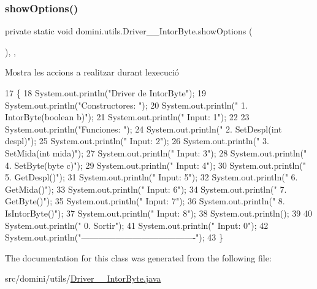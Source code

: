 \subsubsection{\texorpdfstring{show\+Options()}{showOptions()}}
{\footnotesize\ttfamily private static void domini.\+utils.\+Driver\+\_\+\+\_\+\+Intor\+Byte.\+show\+Options (\begin{DoxyParamCaption}{ }\end{DoxyParamCaption})\hspace{0.3cm}{\ttfamily [inline]}, {\ttfamily [static]}, {\ttfamily [private]}}



Mostra les accions a realitzar durant l\textquotesingle{}execució 


\begin{DoxyCode}
17                                      \{
18         System.out.println(\textcolor{stringliteral}{"Driver de IntorByte"});
19         System.out.println(\textcolor{stringliteral}{"Constructores: "});
20         System.out.println(\textcolor{stringliteral}{"     1. IntorByte(boolean b)"});
21         System.out.println(\textcolor{stringliteral}{"     Input: 1"});
22 
23         System.out.println(\textcolor{stringliteral}{"Funciones: "});
24         System.out.println(\textcolor{stringliteral}{"     2. SetDespl(int despl)"});
25         System.out.println(\textcolor{stringliteral}{"     Input: 2"});
26         System.out.println(\textcolor{stringliteral}{"     3. SetMida(int mida)"});
27         System.out.println(\textcolor{stringliteral}{"     Input: 3"});
28         System.out.println(\textcolor{stringliteral}{"     4. SetByte(byte c)"});
29         System.out.println(\textcolor{stringliteral}{"     Input: 4"});
30         System.out.println(\textcolor{stringliteral}{"     5. GetDespl()"});
31         System.out.println(\textcolor{stringliteral}{"     Input: 5"});
32         System.out.println(\textcolor{stringliteral}{"     6. GetMida()"});
33         System.out.println(\textcolor{stringliteral}{"     Input: 6"});
34         System.out.println(\textcolor{stringliteral}{"     7. GetByte()"});
35         System.out.println(\textcolor{stringliteral}{"     Input: 7"});
36         System.out.println(\textcolor{stringliteral}{"     8. IsIntorByte()"});
37         System.out.println(\textcolor{stringliteral}{"     Input: 8"});
38         System.out.println();
39 
40         System.out.println(\textcolor{stringliteral}{"     0. Sortir"});
41         System.out.println(\textcolor{stringliteral}{"     Input: 0"});
42         System.out.println(\textcolor{stringliteral}{"----------------------------------------"});
43     \}
\end{DoxyCode}


The documentation for this class was generated from the following file\+:\begin{DoxyCompactItemize}
\item 
src/domini/utils/\hyperlink{Driver____IntorByte_8java}{Driver\+\_\+\+\_\+\+Intor\+Byte.\+java}\end{DoxyCompactItemize}
